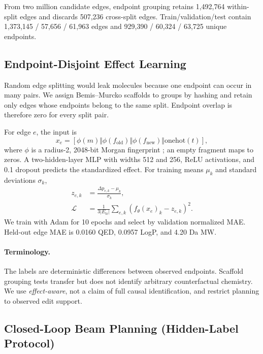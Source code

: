 From two million candidate edges, endpoint grouping retains 1,492,764 within-split edges and discards 507,236 cross-split edges. Train/validation/test contain 1,373,145 / 57,656 / 61,963 edges and 929,390 / 60,324 / 63,725 unique endpoints.

\subsection{Endpoint-Disjoint Effect Learning}

Random edge splitting would leak molecules because one endpoint can occur in many pairs. We assign Bemis--Murcko scaffolds \citep{bemis1996frameworks} to groups by hashing and retain only edges whose endpoints belong to the same split. Endpoint overlap is therefore zero for every split pair.

For edge $e$, the input is
\[
x_e=[\phi(m)\Vert\phi(f_{\mathrm{old}})\Vert
\phi(f_{\mathrm{new}})\Vert\mathrm{onehot}(t)],
\]
where $\phi$ is a radius-2, 2048-bit Morgan fingerprint \citep{rogers2010ecfp}; an empty fragment maps to zeros. A two-hidden-layer MLP with widths 512 and 256, ReLU activations, and 0.1 dropout predicts the standardized effect. For training means $\mu_k$ and standard deviations $\sigma_k$,
\begin{align}
z_{e,k}&=\frac{\Delta p_{e,k}-\mu_k}{\sigma_k},\\
\mathcal{L}&=\frac{1}{3|E_{\mathrm{tr}}|}\sum_{e,k}
\left(f_\theta(x_e)_k-z_{e,k}\right)^2.
\end{align}
We train with Adam for 10 epochs and select by validation normalized MAE. Held-out edge MAE is 0.0160 QED, 0.0957 LogP, and 4.20 Da MW.

\paragraph{Terminology.}
The labels are deterministic differences between observed endpoints. Scaffold grouping tests transfer but does not identify arbitrary counterfactual chemistry. We use \emph{effect-aware}, not a claim of full causal identification, and restrict planning to observed edit support.

\subsection{Closed-Loop Beam Planning (Hidden-Label Protocol)}

